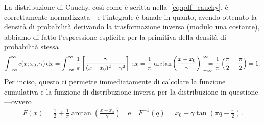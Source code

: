 La distribuzione di Cauchy, così come è scritta nella~\eqref{eq:pdf_cauchy},
è correttamente normalizzata---e l'integrale è banale in quanto, avendo
ottenuto la densità di probabilità derivando la trasformazione inversa
(modulo una costante), abbiamo di fatto l'espressione esplicita per la
primitiva della densità di probabilità stessa
\begin{align*}
  \int_{-\infty}^\infty \cauchypdf[x_0, \gamma]{x} \diff =
  \int_{-\infty}^\infty \frac{1}{\pi}
  \left[\frac{\gamma}{(x - x_0)^2 + \gamma^2} \right] \diff =
  \frac{1}{\pi}
  \eval{\arctan\left(\frac{x - x_0}{\gamma}\right)}{-\infty}{\infty} \;\; =
  \frac{1}{\pi}\left(\frac{\pi}{2} + \frac{\pi}{2}\right) = 1.
\end{align*}
Per inciso, questo ci permette immediatamente di calcolare la funzione
cumulativa e la funzione di distribuzione inversa per la distribuzione in
questione---ovvero
\begin{align}
  F(x) = \frac{1}{2} + \frac{1}{\pi}\arctan\left(\frac{x - x_0}{\gamma}\right)
  \quad \text{e} \quad
  F^{-1}(q) = x_0 + \gamma\tan\left( \pi q - \frac{\pi}{2} \right).
\end{align}

